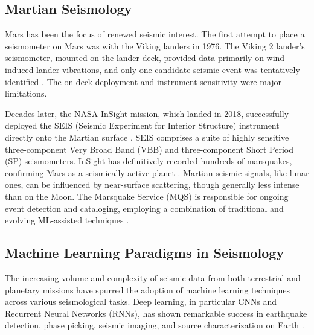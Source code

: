 \documentclass[conference]{IEEEtran}
\begin{document}
    \subsection{ Martian Seismology}
        Mars has been the focus of renewed seismic interest. The first attempt to place a seismometer on Mars was with
        the Viking landers in 1976. The Viking 2 lander's seismometer, mounted on the lander deck, provided data
        primarily on wind-induced lander vibrations, and only one candidate seismic event was tentatively identified
        \cite{Anderson1977,Lognonne2005}. The on-deck deployment and instrument sensitivity were major limitations.

        Decades later, the NASA InSight mission, which landed in 2018, successfully deployed the SEIS (Seismic
        Experiment for Interior Structure) instrument directly onto the Martian surface \cite{Lognonne2019, Banerdt2020}. 
        SEIS comprises a suite of highly sensitive three-component Very Broad Band (VBB) and three-component Short
        Period (SP) seismometers. InSight has definitively recorded hundreds of marsquakes, confirming Mars as a
        seismically active planet \cite{Giardini2020,Clinton2021}. Martian seismic signals, like lunar ones, can be
        influenced by near-surface scattering, though generally less intense than on the Moon. The Marsquake Service
        (MQS) is responsible for ongoing event detection and cataloging, employing a combination of traditional and
        evolving ML-assisted techniques \cite{Clinton2021}.


    \subsection{ Machine Learning Paradigms in Seismology }
        The increasing volume and complexity of seismic data from both terrestrial and planetary missions have spurred the
        adoption of machine learning techniques across various seismological tasks. Deep learning, in particular CNNs and
        Recurrent Neural Networks (RNNs), has shown remarkable success in earthquake detection, phase picking, seismic
        imaging, and source characterization on Earth \cite{MousaviBeroza2022}.
\end{document}
